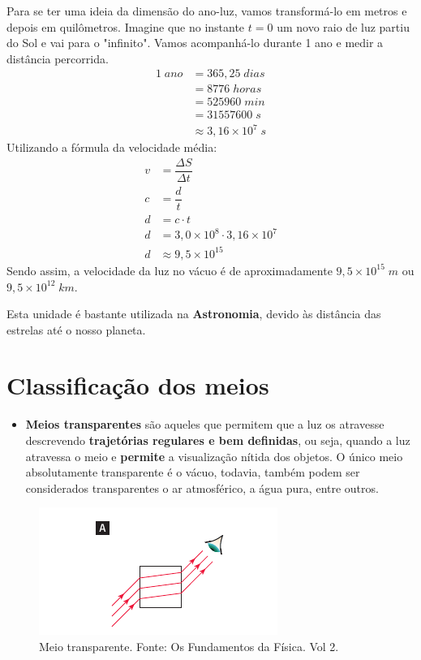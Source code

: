 \documentclass[11pt,twocolumn,oneside]{article}
\begin{document}
Para se ter uma ideia da dimensão do ano-luz, vamos transformá-lo em metros e depois em quilômetros. Imagine que no instante $t=0$ um novo raio de luz partiu do Sol e vai para o "infinito". Vamos acompanhá-lo durante 1 ano e medir a distância percorrida.
\begin{align*}
    1\;ano  &= 365,25\;dias \\
            &= 8776\;horas \\
            &= 525960\;min \\
            &= 31557600\;s \\
            &\approx 3,16\times 10^{7}\;s
\end{align*}
Utilizando a fórmula da velocidade média:
\begin{align*}
    v &= \dfrac{\Delta S}{\Delta t} \\
    c &= \dfrac{d}{t} \\
    d &= c \cdot t \\
    d &= 3,0\times 10^{8} \cdot 3,16\times 10^{7} \\
    d &\approx 9,5 \times 10^{15}
\end{align*}
Sendo assim, a velocidade da luz no vácuo é de aproximadamente $9,5\times 10^{15}\;m$ ou $9,5\times 10^{12}\;km$.


Esta unidade é bastante utilizada na \textbf{Astronomia}, devido às distância das estrelas até o nosso planeta.


\hypertarget{x-classificação-dos-meios}{\section{Classificação dos meios}}
\begin{itemize}

\item \textbf{Meios transparentes} são aqueles que permitem que a luz os atravesse descrevendo \textbf{trajetórias regulares e bem definidas}, ou seja, quando a luz atravessa o meio  e \textbf{permite} a visualização nítida dos objetos. O único meio absolutamente transparente é o vácuo, todavia, também podem ser considerados transparentes o ar atmosférico, a água pura, entre outros.

\end{itemize}


\begin{figure}[h]{}
\centering\includegraphics[width=2.5truein]{img4.png}
\caption{Meio transparente. Fonte: Os Fundamentos da Física. Vol 2.}
\centering
\end{figure}
\end{document}
